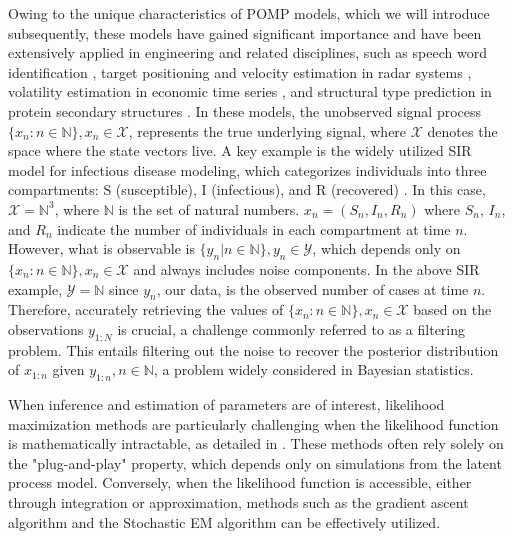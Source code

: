\documentclass[10pt]{article}
\begin{document}
Owing to the unique characteristics of POMP models, which we will introduce subsequently, these models have gained significant importance and have been extensively applied in engineering and related disciplines, such as speech word identification \citep{rabiner1989}, target positioning and velocity estimation in radar systems \citep{gordon1993, avitzour1995}, volatility estimation in economic time series \citep{Pitt1999-volatility}, and structural type prediction in protein secondary structures \citep{Schmidler2000-protein}. In these models, the unobserved signal process $\{x_n: n \in \mathds{N}\}, x_n \in \mathcal{X}$, represents the true underlying signal, where $\mathcal{X}$ denotes the space where the state vectors live. A key example is the widely utilized SIR model for infectious disease modeling, which categorizes individuals into three compartments: S (susceptible), I (infectious), and R (recovered) \citep{daihai, seircov, SEIRmodel}. In this case, $\mathcal{X} = \mathds{N}^3$, where $\mathds{N}$ is the set of natural numbers. $x_n =  (S_n, I_n, R_n)$ where $S_n$, $I_n$, and $R_n$ indicate the number of individuals in each compartment at time $n$. However, what is observable is $\{y_n|n\in \mathds{N}\}, y_n \in \mathcal{Y}$, which depends only on $\{x_n: n\in\mathds{N}\}, x_n \in \mathcal{X}$ and always includes noise components. In the above SIR example, $\mathcal{Y} = \mathds{N}$ since $y_n$, our data, is the observed number of cases at time $n$. Therefore, accurately retrieving the values of $\{x_n: n\in\mathds{N}\}, x_n \in \mathcal{X}$ based on the observations $y_{1:N}$ is crucial, a challenge commonly referred to as a filtering problem. This entails filtering out the noise to recover the posterior distribution of $x_{1:n}$ given $y_{1:n}, n\in\mathds{N}$, a problem widely considered in Bayesian statistics. \citep{gordon1993, geweke1989, bayesiandoucet, pmcmc}


When inference and estimation of parameters are of interest, likelihood maximization methods are particularly challenging when the likelihood function is mathematically intractable, as detailed in \cite{Breto2019-sz, iteratedfiltering, daihai}. These methods often rely solely on the "plug-and-play" property, which depends only on simulations from the latent process model. Conversely, when the likelihood function is accessible, either through integration or approximation, methods such as the gradient ascent algorithm \citep{Lemarechal2012, Hadamard1908, Courant1943} and the Stochastic EM algorithm \citep{stochasticEM} can be effectively utilized.
\end{document}
